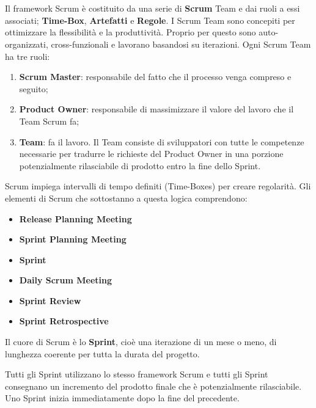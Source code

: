 \section*{\color{Blue}{LA SOSTANZA DI SCRUM}}
Il framework Scrum  \`e costituito da una serie  di
\textbf{Scrum} Team e dai ruoli a essi associati; \textbf{Time-Box}, \textbf{Artefatti} e \textbf{Regole}.
I  Scrum Team sono concepiti per   ottimizzare la  flessibilit\`a e  la produttivit\`a. Proprio per questo
sono auto-organizzati, cross-funzionali e lavorano basandosi su iterazioni.
Ogni Scrum Team ha tre ruoli: 

\begin{enumerate}
\item \textbf{Scrum Master}: responsabile del fatto che il processo venga compreso e seguito;
\item \textbf{Product Owner}: responsabile di massimizzare il valore
del lavoro  che il  Team Scrum  fa; 
\item \textbf{Team}: fa  il lavoro. Il Team consiste di
sviluppatori con  tutte le  competenze necessarie  per tradurre le richieste  del
Product Owner in  una
porzione potenzialmente rilasciabile di prodotto entro  la fine  dello Sprint.
\end{enumerate}

Scrum impiega intervalli di tempo definiti (Time-Boxes) per creare regolarit\`a. Gli elementi di Scrum che sottostanno a
questa logica comprendono:
\begin{itemize}
\item \textbf{Release  Planning  Meeting} 
\item \textbf{Sprint Planning  Meeting}
\item \textbf{Sprint}
\item \textbf{Daily Scrum Meeting}
\item \textbf{Sprint Review}
\item \textbf{Sprint Retrospective}
\end{itemize}

Il cuore di Scrum \`e lo \textbf{Sprint}, cio\`e una iterazione di un mese o meno, di lunghezza coerente per
tutta la durata del progetto.

Tutti gli Sprint utilizzano  lo stesso framework Scrum  e tutti
gli Sprint  consegnano un  incremento del  prodotto finale  che \`e potenzialmente
rilasciabile.  Uno  Sprint inizia  immediatamente  dopo la fine del precedente.

